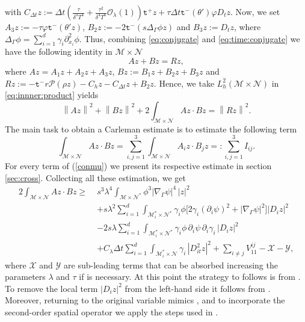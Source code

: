 \documentclass[11pt,oneside,leqno]{amsart}
\numberwithin{equation}{section}
\numberwithin{equation}{section}
\newcommand{\trp}{\mathtt t^+}
\newcommand{\trm}{\mathtt t^-}
\begin{document}
with $C_{\Delta t}z:=\Delta t\left(\frac{\tau}{\delta^{3}T^{4}}+\frac{\tau^{2}}{\delta^{4}T^{6}} \mathcal{O}_{\lambda}(1)\right)\trp z+\tau\Delta t\trm(\theta')\varphi D_{t}z$. Now, we set $A_{3}z:=-\tau\varphi\trm(\theta'z)$, $B_{2}z:=-2\trm(s\Delta_{\Gamma}\phi z)$ and $B_{3}z:=D_{t}z$, where $\Delta_{\Gamma}\phi=\sum_{i=1}^{d}\gamma_{i}\partial_{x_{i}}^{2}\phi$. Thus, combining \eqref{eq:conjugate} and \eqref{eq:time:conjugate} we have the following identity in $\mathcal{M}\times\mathcal{N}$
\begin{equation}\label{eq:innner:product}
    Az+Bz=Rz,
\end{equation}
where $Az=A_{1}z+A_{2}z+A_{3}z$, $Bz:=B_{1}z+B_{2}z+B_{3}z$ and $Rz:=-\trm r\mathcal{P}(\rho z)-C_{h}z-C_{\Delta t}z+B_{2}z$. Hence, we take $L_{h}^{2}(\mathcal{M}\times\mathcal{N})$ in \eqref{eq:innner:product} yields 
\begin{equation}\label{eq:inner:product:2}
    \left\| Az\right\|^{2}+\left\| Bz\right\|^{2}+2\int_{\mathcal{M}\times\mathcal{N}}Az\cdot Bz=\left\| Rz\right\|^{2}.
\end{equation}
The main task to obtain a Carleman estimate is to estimate the following term 
\begin{equation}\label{conmu}
    \int_{\mathcal{M}\times\mathcal{N}}Az\cdot B z=\sum_{i,j=1}^{3}\int_{\mathcal{M}\times\mathcal{N}}A_{i}z\cdot B_{j}z=:\sum_{i,j=1}^{3}I_{ij}. 
\end{equation}
 For every term of (\ref{conmu}) we present its respective estimate in section \ref{sec:cross}. Collecting all these estimation, we get
 \begin{equation}\label{eq:combined:recall}
\begin{aligned}
2\int_{\mathcal{M}\times\mathcal{N}}Az\cdot Bz\geq\;&s^{3}\lambda^{4}\int_{\mathcal{M}\times\mathcal{N}^{\ast}}\phi^{3}|\nabla_{\Gamma}\psi|^{4}\,|z|^{2}\\
&+s\lambda^{2}\sum_{i=1}^{d}\int_{\mathcal{M}_{i}^{\ast}\times\mathcal{N}^{\ast}}\gamma_{i}\phi\Big[2\gamma_{i}(\partial_{i}\psi)^{2}+|\nabla_{\Gamma}\psi|^{2}\Big]|D_{i}z|^{2}\\
&-2s\lambda\sum_{i=1}^{d}\int_{\mathcal{M}_{i}^{\ast}\times\mathcal{N}^{\ast}}\gamma_{i}\phi\,\partial_{i}\psi\,\partial_{i}\gamma_{i}\,|D_{i}z|^{2}\\
&+C_{\lambda}\Delta t\sum_{i=1}^{d}\int_{\mathcal{M}_{i}^{\ast}\times\mathcal{N}}\gamma_{i}\,|D_{it}^{2}z|^{2}+\sum_{i\ne j}V_{11}^{ij}-\mathcal{X}-\mathcal{Y},
\end{aligned}
\end{equation}
where $\mathcal{X}$ and $\mathcal{Y}$ are sub-leading terms that can be absorbed increasing the parameters $\lambda$ and $\tau$ if is necessary. At this point the strategy to follows is from \cite[Lemma 2.12]{GC-HS-2021}. To remove the local term $|D_{i}z|^{2}$ from the left-hand side it follows from \cite[Lemma 2.16]{GC-HS-2021}. Moreover, returning to the original variable mimics \cite[Lemma 9]{LMPZ:2023}, and to incorporate the second-order spatial operator we apply the steps used in \cite[Theorem 1.2]{LLRP:2025}.
\end{document}
